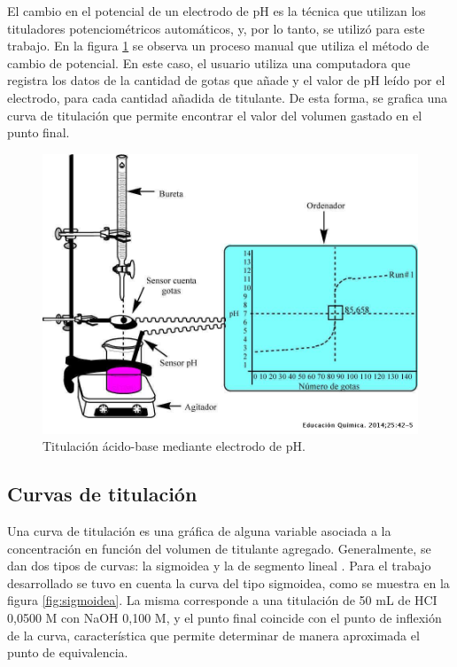 El cambio en el potencial de un electrodo de pH es la técnica que utilizan los tituladores potenciométricos automáticos, y, por lo tanto, se utilizó para este trabajo. En la figura \ref{fig:titManualPot} se observa un proceso manual que utiliza el método de cambio de potencial. En este caso, el usuario utiliza una computadora que registra los datos de la cantidad de gotas que añade y el valor de pH leído por el electrodo, para cada cantidad añadida de titulante. De esta forma, se grafica una curva de titulación que permite encontrar el valor del volumen gastado en el punto final.


\begin{figure}[htbp]
	\centering
	\includegraphics[width=.7\textwidth]{./Figures/titulacionPotManual.jpeg}
	\caption{Titulación ácido-base mediante electrodo de pH\protect\footnotemark.}
	\label{fig:titManualPot}
\end{figure}


\subsection{Curvas de titulación}

Una curva de titulación es una gráfica de alguna variable asociada a la concentración en función del volumen de titulante agregado. Generalmente, se dan dos tipos de curvas: la sigmoidea y la de segmento lineal \citep{BOOK:1}.
Para el trabajo desarrollado se tuvo en cuenta la curva del tipo sigmoidea, como se muestra en la figura \ref{fig:sigmoidea}. La misma corresponde a una titulación de 50 mL de HCI 0,0500 M con NaOH 0,100 M, y el punto final coincide con el punto de inflexión de la curva, característica que permite determinar de manera aproximada el punto de equivalencia. 

